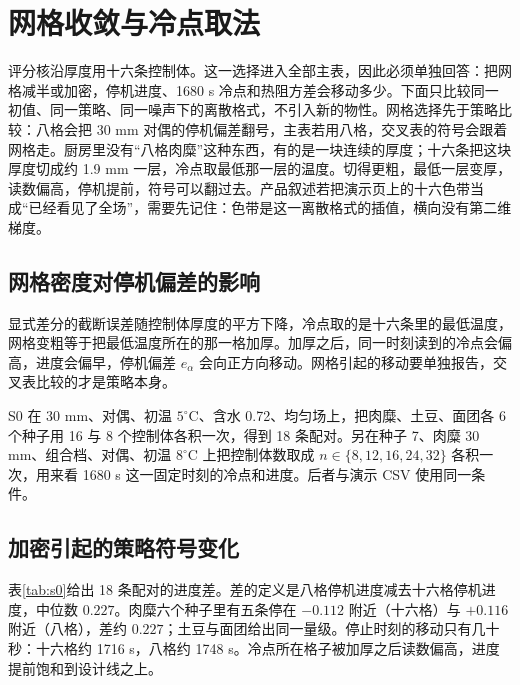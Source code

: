 \chapter{网格收敛与冷点取法}
\label{ch:grid}

评分核沿厚度用十六条控制体。这一选择进入全部主表，因此必须单独回答：把网格减半或加密，停机进度、1680 s 冷点和热阻方差会移动多少。下面只比较同一初值、同一策略、同一噪声下的离散格式，不引入新的物性。网格选择先于策略比较：八格会把 30 mm 对偶的停机偏差翻号，主表若用八格，交叉表的符号会跟着网格走。厨房里没有“八格肉糜”这种东西，有的是一块连续的厚度；十六条把这块厚度切成约 1.9 mm 一层，冷点取最低那一层的温度。切得更粗，最低一层变厚，读数偏高，停机提前，符号可以翻过去。产品叙述若把演示页上的十六色带当成“已经看见了全场”，需要先记住：色带是这一离散格式的插值，横向没有第二维梯度。

\section{网格密度对停机偏差的影响}

显式差分的截断误差随控制体厚度的平方下降，冷点取的是十六条里的最低温度，网格变粗等于把最低温度所在的那一格加厚。加厚之后，同一时刻读到的冷点会偏高，进度会偏早，停机偏差 \(e_{\alpha}\) 会向正方向移动。网格引起的移动要单独报告，交叉表比较的才是策略本身。

S0 在 30 mm、对偶、初温 \(5^\circ\mathrm{C}\)、含水 0.72、均匀场上，把肉糜、土豆、面团各 6 个种子用 16 与 8 个控制体各积一次，得到 18 条配对。另在种子 7、肉糜 30 mm、组合档、对偶、初温 \(8^\circ\mathrm{C}\) 上把控制体数取成 \(n\in\{8,12,16,24,32\}\) 各积一次，用来看 1680 s 这一固定时刻的冷点和进度。后者与演示 CSV 使用同一条件。

\section{加密引起的策略符号变化}

表\ref{tab:s0}给出 18 条配对的进度差。差的定义是八格停机进度减去十六格停机进度，中位数 \(0.227\)。肉糜六个种子里有五条停在 \(-0.112\) 附近（十六格）与 \(+0.116\) 附近（八格），差约 \(0.227\)；土豆与面团给出同一量级。停止时刻的移动只有几十秒：十六格约 1716 s，八格约 1748 s。冷点所在格子被加厚之后读数偏高，进度提前饱和到设计线之上。

